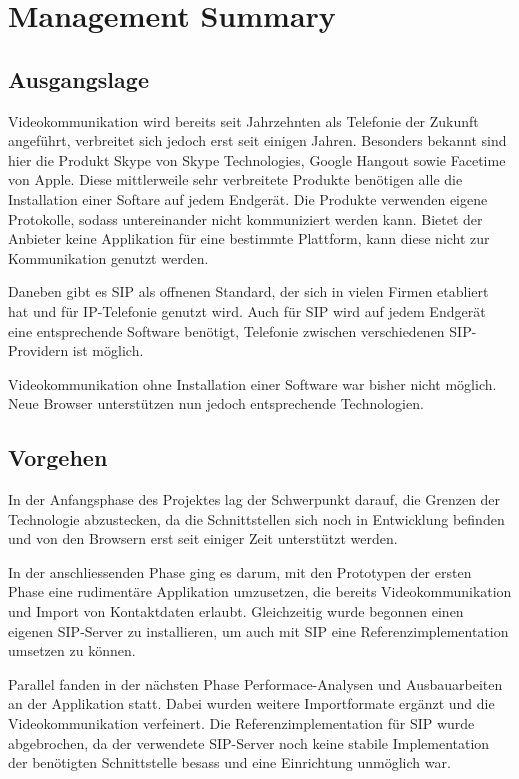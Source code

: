 \chapter{Management Summary}

\section{Ausgangslage}
Videokommunikation wird bereits seit Jahrzehnten als Telefonie der Zukunft angeführt, verbreitet sich jedoch erst seit einigen Jahren. 
Besonders bekannt sind hier die Produkt Skype von Skype Technologies, Google Hangout sowie Facetime von Apple.
Diese mittlerweile sehr verbreitete Produkte benötigen alle die Installation einer Softare auf jedem Endgerät. Die Produkte verwenden eigene Protokolle, sodass untereinander nicht kommuniziert werden kann. Bietet der Anbieter keine Applikation für eine bestimmte Plattform, kann diese nicht zur Kommunikation genutzt werden.

Daneben gibt es SIP als offnenen Standard, der sich in vielen Firmen etabliert hat und für IP-Telefonie genutzt wird. Auch für SIP wird auf jedem Endgerät eine entsprechende Software benötigt, Telefonie zwischen verschiedenen SIP-Providern ist möglich.

Videokommunikation ohne Installation einer Software war bisher nicht möglich. Neue Browser unterstützen nun jedoch entsprechende Technologien.


\section{Vorgehen}
In der Anfangsphase des Projektes lag der Schwerpunkt darauf, die Grenzen der Technologie abzustecken, da die Schnittstellen sich noch in Entwicklung befinden und von den Browsern erst seit einiger Zeit unterstützt werden.

In der anschliessenden Phase ging es darum, mit den Prototypen der ersten Phase eine rudimentäre Applikation umzusetzen, die bereits Videokommunikation und Import von Kontaktdaten erlaubt. Gleichzeitig wurde begonnen einen eigenen SIP-Server zu installieren, um auch mit SIP eine Referenzimplementation umsetzen zu können.

Parallel fanden in der nächsten Phase Performace-Analysen und Ausbauarbeiten an der Applikation statt. Dabei wurden weitere Importformate ergänzt und die Videokommunikation verfeinert.
Die Referenzimplementation für SIP wurde abgebrochen, da der verwendete SIP-Server noch keine stabile Implementation der benötigten Schnittstelle besass und eine Einrichtung unmöglich war.

